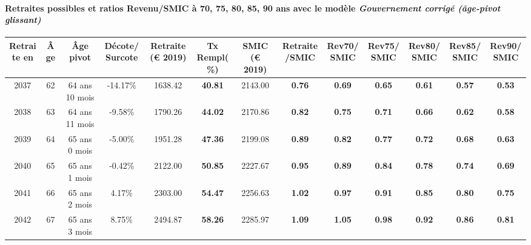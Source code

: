 \paragraph{Retraites possibles et ratios Revenu/SMIC à 70, 75, 80, 85, 90 ans avec le modèle \emph{Gouvernement corrigé (âge-pivot glissant)}}  
 
{ \scriptsize \begin{center} 
\begin{tabular}[htb]{|c|c||c|c||c|c||c||c|c|c|c|c|c|} 
\hline 
 Retraite en &  Âge &  Âge pivot &  Décote/Surcote &  Retraite (\euro{} 2019) &  Tx Rempl(\%) &  SMIC (\euro{} 2019) &  Retraite/SMIC &  Rev70/SMIC &  Rev75/SMIC &  Rev80/SMIC &  Rev85/SMIC &  Rev90/SMIC \\ 
\hline \hline 
 2037 &  62 &  64 ans 10 mois &  -14.17\% &  1638.42 &  {\bf 40.81} &  2143.00 &  {\bf {\color{red} 0.76}} &  {\bf {\color{red} 0.69}} &  {\bf {\color{red} 0.65}} &  {\bf {\color{red} 0.61}} &  {\bf {\color{red} 0.57}} &  {\bf {\color{red} 0.53}} \\ 
\hline 
 2038 &  63 &  64 ans 11 mois &  -9.58\% &  1790.26 &  {\bf 44.02} &  2170.86 &  {\bf {\color{red} 0.82}} &  {\bf {\color{red} 0.75}} &  {\bf {\color{red} 0.71}} &  {\bf {\color{red} 0.66}} &  {\bf {\color{red} 0.62}} &  {\bf {\color{red} 0.58}} \\ 
\hline 
 2039 &  64 &  65 ans 0 mois &  -5.00\% &  1951.28 &  {\bf 47.36} &  2199.08 &  {\bf {\color{red} 0.89}} &  {\bf {\color{red} 0.82}} &  {\bf {\color{red} 0.77}} &  {\bf {\color{red} 0.72}} &  {\bf {\color{red} 0.68}} &  {\bf {\color{red} 0.63}} \\ 
\hline 
 2040 &  65 &  65 ans 1 mois &  -0.42\% &  2122.00 &  {\bf 50.85} &  2227.67 &  {\bf {\color{red} 0.95}} &  {\bf {\color{red} 0.89}} &  {\bf {\color{red} 0.84}} &  {\bf {\color{red} 0.78}} &  {\bf {\color{red} 0.74}} &  {\bf {\color{red} 0.69}} \\ 
\hline 
 2041 &  66 &  65 ans 2 mois &  4.17\% &  2303.00 &  {\bf 54.47} &  2256.63 &  {\bf 1.02} &  {\bf {\color{red} 0.97}} &  {\bf {\color{red} 0.91}} &  {\bf {\color{red} 0.85}} &  {\bf {\color{red} 0.80}} &  {\bf {\color{red} 0.75}} \\ 
\hline 
 2042 &  67 &  65 ans 3 mois &  8.75\% &  2494.87 &  {\bf 58.26} &  2285.97 &  {\bf 1.09} &  {\bf 1.05} &  {\bf {\color{red} 0.98}} &  {\bf {\color{red} 0.92}} &  {\bf {\color{red} 0.86}} &  {\bf {\color{red} 0.81}} \\ 
\hline 
\hline 
\end{tabular} 
\end{center} } 
